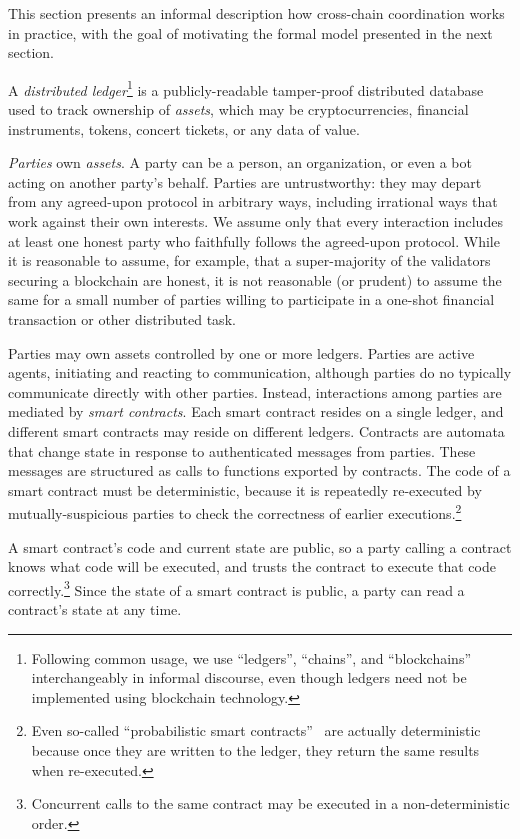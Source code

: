 This section presents an informal description
how cross-chain coordination works in practice,
with the goal of motivating the formal model presented in the next section.

A \emph{distributed ledger}\footnote{
Following common usage, we use ``ledgers'', ``chains'', and ``blockchains''
interchangeably in informal discourse,
even though ledgers need not be implemented using blockchain technology.
} is a publicly-readable tamper-proof distributed database
used to track ownership of  \emph{assets},
which may be cryptocurrencies,
financial instruments, tokens, concert tickets,
or any data of value.

\emph{Parties} own \emph{assets}.
A party can be a person, an organization, or even a bot acting on another party's behalf.
Parties are untrustworthy:
they may depart from any agreed-upon protocol in arbitrary ways,
including irrational ways that work against their own interests.
We assume only that every interaction includes at least one honest party who faithfully follows the agreed-upon protocol. 
While it is reasonable to assume, for example,
that a super-majority of the validators securing a blockchain are honest,
it is not reasonable (or prudent) to assume the same for a small number
of parties willing to participate in a one-shot financial transaction or other distributed task.
 
Parties may own assets controlled by one or more ledgers.
Parties are active agents, initiating and reacting to communication,
although parties do no typically communicate directly with other parties.
Instead,
interactions among parties are mediated by \emph{smart contracts}.
Each smart contract resides on a single ledger,
and different smart contracts may reside on different ledgers.
Contracts are automata that change state
in response to authenticated messages from parties. These messages are  structured as calls to functions exported by contracts.
The code of a smart contract must be deterministic, because it is repeatedly re-executed by mutually-suspicious parties
to check the correctness of earlier executions.\footnote{Even so-called ``probabilistic smart contracts''~\cite{ChatterjeeGP2019}
are actually deterministic because once they are written to the ledger,
they return the same results when re-executed.}

A smart contract's code and current state are public,
so a party calling a contract knows what code will be executed,
and trusts the contract to execute that code correctly.\footnote{Concurrent
calls to the same contract may be executed in
a non-deterministic order.}
Since the state of a smart contract is public,
a party can read a contract's state at any time.

